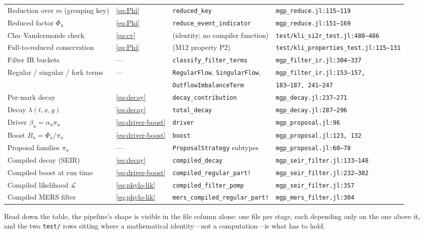 \documentclass[11pt,leqno]{article}
\newcommand{\lik}{\mathcal{L}}      %
\newcommand{\code}[1]{\texttt{#1}}
\theoremstyle{plain}
\theoremstyle{definition}
\begin{document}
\begin{longtable}{@{}p{}p{}p{}p{}@{}}
\addlinespace
Reduction over $m$ (grouping key) & \eqref{eq:Phi} &
  \code{reduced\_key} & \code{mgp\_reduce.jl:115--119} \\
Reduced factor $\Phi_u$ & \eqref{eq:Phi} &
  \code{reduce\_event\_indicator} & \code{mgp\_reduce.jl:151--169} \\
Chu--Vandermonde check & \eqref{eq:cv} &
  (identity; no compiler function) & \code{test/kli\_si2r\_test.jl:480--486} \\
Full-to-reduced conservation & \eqref{eq:Phi} &
  (M12 property P2) & \code{test/kli\_properties\_test.jl:115--131} \\
\addlinespace
Filter IR buckets & --- &
  \code{classify\_filter\_terms} & \code{mgp\_filter\_ir.jl:304--337} \\
Regular / singular / fork terms & --- &
  \code{RegularFlow}, \code{SingularFlow}, & \code{mgp\_filter\_ir.jl:153--157,} \\
 & & \code{OutflowImbalanceTerm} & \code{183--187, 241--247} \\
\addlinespace
Per-mark decay & \eqref{eq:decay} &
  \code{decay\_contribution} & \code{mgp\_decay.jl:237--271} \\
Decay $\lambda(t,x,y)$ & \eqref{eq:decay} &
  \code{total\_decay} & \code{mgp\_decay.jl:287--296} \\
Driver $\beta_u = \alpha_u\pi_u$ & \eqref{eq:driver-boost} &
  \code{driver} & \code{mgp\_proposal.jl:96} \\
Boost $B_u = \Phi_u/\pi_u$ & \eqref{eq:driver-boost} &
  \code{boost} & \code{mgp\_proposal.jl:123, 132} \\
Proposal families $\pi_u$ & --- &
  \code{ProposalStrategy} subtypes & \code{mgp\_proposal.jl:60--78} \\
\addlinespace
Compiled decay (SEIR) & \eqref{eq:decay} &
  \code{compiled\_decay} & \code{mgp\_seir\_filter.jl:133--148} \\
Compiled boost at run time & \eqref{eq:driver-boost} &
  \code{compiled\_regular\_part!} & \code{mgp\_seir\_filter.jl:232--302} \\
Compiled likelihood $\lik$ & \eqref{eq:phylo-lik} &
  \code{compiled\_filter\_pomp} & \code{mgp\_seir\_filter.jl:357} \\
Compiled MERS filter & \eqref{eq:phylo-lik} &
  \code{mers\_compiled\_regular\_part!} & \code{mgp\_mers\_filter.jl:304} \\
\end{longtable}

Read down the table, the pipeline's shape is visible in the file column
alone: one file per stage, each depending only on the one above it, and the
two \code{test/} rows sitting where a mathematical identity---not a
computation---is what has to hold.
\end{document}
